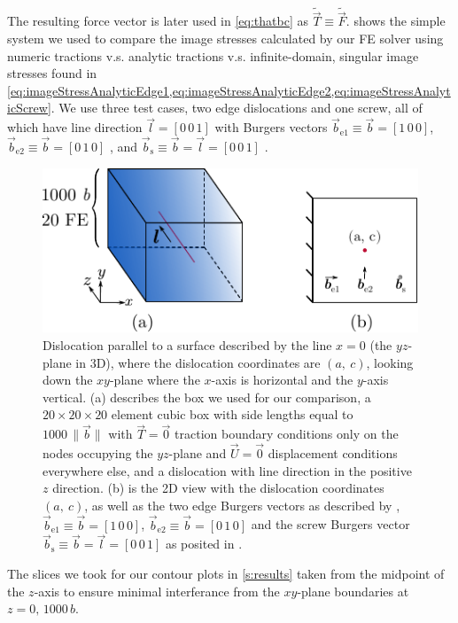 \documentclass[11pt]{iopart}
\begin{document}
The resulting force vector is later used in \cref{eq:thatbc} as $\tilde{\vec{T}} \equiv \tilde{\vec{F}}$.  shows the simple system we used to compare the image stresses calculated by our FE solver using numeric tractions v.s. analytic tractions v.s. infinite-domain, singular image stresses found in \cref{eq:imageStressAnalyticEdge1,eq:imageStressAnalyticEdge2,eq:imageStressAnalyticScrew}. We use three test cases, two edge dislocations and one screw, all of which have line direction $\vec{l} = [0\, 0\, 1]$ with Burgers vectors $\vec{b}_\textrm{e1} \equiv \vec{b} = [1\, 0\, 0]$, $\vec{b}_\textrm{e2} \equiv \vec{b} = [0\, 1\, 0]$ \cite{head1953edge}, and $\vec{b}_\textrm{s} \equiv \vec{b} = \vec{l} = [0\, 0\, 1] $ \cite{hirth1983theory}.
\begin{figure}
    \centering
    \includegraphics[width=0.8\linewidth]{head_vs_fe_tractions_setup_diagram.pdf}
    \caption{Dislocation parallel to a surface described by the line $x = 0$ (the $yz$-plane in 3D), where the dislocation coordinates are $(a,~c)$, looking down the $xy$-plane where the $x$-axis is horizontal and the $y$-axis vertical. (a) describes the box we used for our comparison, a  $20 \times 20 \times 20$ element cubic box with side lengths equal to $1000\, \lVert \vec{b} \rVert$ with $\vec{T} = \vec{0}$ traction boundary conditions only on the nodes occupying the $yz$-plane and $\vec{U} = \vec{0}$ displacement conditions everywhere else, and a dislocation with line direction in the positive $z$ direction. (b) is the 2D view with the dislocation coordinates $(a,~c)$, as well as the two edge Burgers vectors as described by \cite{head1953edge}, $\vec{b}_\textrm{e1} \equiv \vec{b} = [1\, 0\, 0]$, $\vec{b}_\textrm{e2} \equiv \vec{b} = [0\, 1\, 0]$ and the screw Burgers vector $\vec{b}_\textrm{s} \equiv \vec{b} = \vec{l} = [0\, 0\, 1] $ as posited in \cite{hirth1983theory}.}
    \label{f:headvstractionfem}
\end{figure}
The slices we took for our contour plots in \cref{s:results} taken from the midpoint of the $z$-axis to ensure minimal interferance from the $xy$-plane boundaries at $z=0,\, 1000\,b$.
\end{document}
